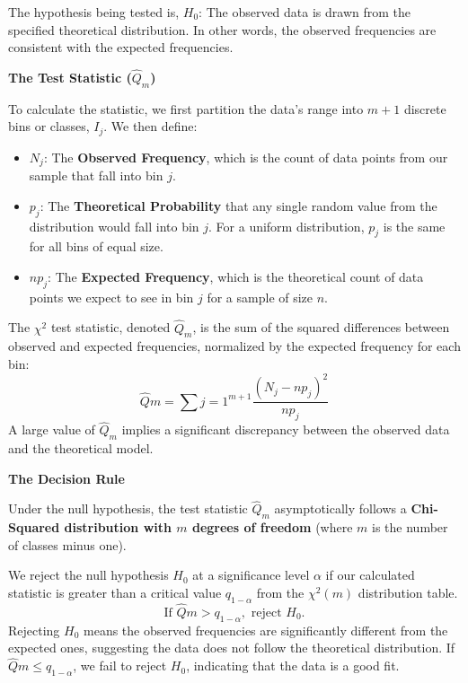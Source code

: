 \begin{enumerate}
        The hypothesis being tested is, $H_0$: The observed data is drawn from the specified theoretical distribution. In other words, the observed frequencies are consistent with the expected frequencies.

        \vspace{1em}
        \noindent\textbf{The Test Statistic ($\hat{Q}_m$)}
        \vspace{0.5em}

        To calculate the statistic, we first partition the data's range into $m+1$ discrete bins or classes, $I_j$. We then define:
        \begin{itemize}
            \item $N_j$: The \textbf{Observed Frequency}, which is the count of data points from our sample that fall into bin $j$.
            \item $p_j$: The \textbf{Theoretical Probability} that any single random value from the distribution would fall into bin $j$. For a uniform distribution, $p_j$ is the same for all bins of equal size.
            \item $np_j$: The \textbf{Expected Frequency}, which is the theoretical count of data points we expect to see in bin $j$ for a sample of size $n$.
        \end{itemize}
        The $\chi^2$ test statistic, denoted $\hat{Q}_m$, is the sum of the squared differences between observed and expected frequencies, normalized by the expected frequency for each bin:
        \[
        \hat{Q}m = \sum{j=1}^{m+1} \frac{(N_j - np_j)^2}{np_j}
        \]
        A large value of $\hat{Q}_m$ implies a significant discrepancy between the observed data and the theoretical model.

        \vspace{1em}
        \noindent\textbf{The Decision Rule}
        \vspace{0.5em}

        Under the null hypothesis, the test statistic $\hat{Q}_m$ asymptotically follows a \textbf{Chi-Squared distribution with $m$ degrees of freedom} (where $m$ is the number of classes minus one).

        We reject the null hypothesis $H_0$ at a significance level $\alpha$ if our calculated statistic is greater than a critical value $q_{1-\alpha}$ from the $\chi^2(m)$ distribution table.
        \[
        \text{If } \hat{Q}m > q_{1-\alpha}, \text{ reject } H_0.
        \]
        Rejecting $H_0$ means the observed frequencies are significantly different from the expected ones, suggesting the data does not follow the theoretical distribution. If $\hat{Q}m \le q_{1-\alpha}$, we fail to reject $H_0$, indicating that the data is a good fit.
    
\end{enumerate}

